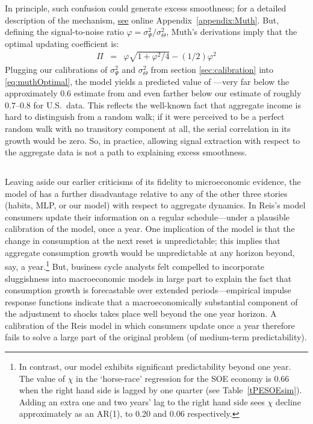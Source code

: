 \documentclass[titlepage]{article}
\begin{document}
In principle, such confusion could generate excess smoothness; for a detailed description of the mechanism, \hyperlink{MuthLucasPischke}{see} online Appendix~\ref{appendix:Muth}.  But, defining the signal-to-noise ratio $\varphi=\sigma^2_{\Psi}/\sigma^2_{\Theta}$, Muth's derivations imply that the optimal updating coefficient is:
  \begin{eqnarray}
\Pi & = & \varphi \sqrt{1+\varphi^{2}/4} - (1/2) \varphi^{2} \label{eq:muthOptimal}
  \end{eqnarray}
Plugging our calibrations of $\sigma^2_{\Psi}$ and $\sigma^2_{\Theta}$ from section \ref{sec:calibration} into \eqref{eq:muthOptimal}, the model yields a predicted value of ---very far below the approximately $0.6$ estimate from \cite{hrsHabit} and even farther below our estimate of roughly $0.7$--$0.8$ for U.S.\ data.  This reflects the well-known fact that aggregate income is hard to distinguish from a random walk; if it were perceived to be a perfect random walk with no transitory component at all, the serial correlation in its growth would be zero.  So, in practice, allowing signal extraction with respect to the aggregate data is not a path to explaining excess smoothness.

\subsection{\cite{reis:inattentive}}

Leaving aside our earlier criticisms of its fidelity to microeconomic evidence, the model of \cite{reis:inattentive} has a further disadvantage relative to any of the other three stories (habits, MLP, or our model) with respect to aggregate dynamics. In Reis's model consumers update their information on a regular schedule---under a plausible calibration of the model, once a year. One implication of the model is that the change in consumption at the next reset is unpredictable; this implies that aggregate consumption growth would be unpredictable at any horizon beyond, say, a year.\footnote{In contrast, our model exhibits significant predictability beyond one year. The value of $\chi$ in the `horse-race' regression for the SOE economy is 0.66 when the right hand side is lagged by one quarter (see Table~\ref{tPESOEsim}). Adding an extra one and two years' lag to the right hand side sees $\chi$ decline approximately as an AR(1), to 0.20 and 0.06 respectively.}  But, business cycle analysts felt compelled to incorporate sluggishness into macroeconomic models in large part to explain the fact that consumption growth is forecastable over extended periods---empirical impulse response functions indicate that a macroeconomically substantial component of the adjustment to shocks takes place well beyond the one year horizon.  A calibration of the Reis model in which consumers update once a year therefore fails to solve a large part of the original problem (of medium-term predictability).
\end{document}
